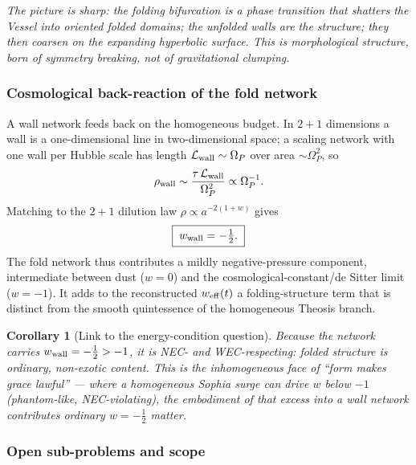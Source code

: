 \documentclass[11pt,a4paper]{article}
\newcommand{\Op}{\Omega_P}
\newcommand{\note}[1]{\textcolor{black!65}{\emph{#1}}}
\theoremstyle{plain}
\newtheorem{corollary}{Corollary}[section]
\theoremstyle{definition}
\theoremstyle{remark}
\begin{document}
\note{The picture is sharp: the folding bifurcation is a phase transition that shatters the Vessel into
oriented folded domains; the unfolded walls are the structure; they then coarsen on the expanding
hyperbolic surface. This is morphological structure, born of symmetry breaking, not of gravitational
clumping.}

\subsubsection{Cosmological back-reaction of the fold network}

A wall network feeds back on the homogeneous budget. In $2{+}1$ dimensions a wall is a one-dimensional
line in two-dimensional space; a scaling network with one wall per Hubble scale has length
$\mathcal L_{\rm wall}\sim\Op$ over area $\sim\Op^2$, so
\begin{equation}
\rho_{\rm wall}\sim\frac{\tau\,\mathcal L_{\rm wall}}{\Op^2}\propto\Op^{-1}.
\end{equation}
Matching to the $2{+}1$ dilution law $\rho\propto a^{-2(1+w)}$ gives
\begin{equation}
\boxed{\;w_{\rm wall}=-\tfrac12.\;}
\end{equation}
The fold network thus contributes a mildly negative-pressure component, intermediate between dust
($w=0$) and the cosmological-constant/de Sitter limit ($w=-1$). It adds to the reconstructed
$w_{\rm eff}(t)$ a folding-structure term that is distinct from the smooth quintessence of the
homogeneous Theosis branch.

\begin{corollary}[Link to the energy-condition question]
Because the network carries $w_{\rm wall}=-\tfrac12>-1$, it is NEC- and WEC-respecting: folded structure
is ordinary, non-exotic content. This is the inhomogeneous face of ``form makes grace lawful'' --- where
a homogeneous Sophia surge can drive $w$ below $-1$ (phantom-like, NEC-violating), the embodiment of that
excess into a wall network contributes ordinary $w=-\tfrac12$ matter.
\end{corollary}

\subsubsection{Open sub-problems and scope}
\end{document}
